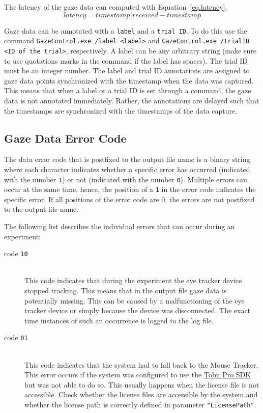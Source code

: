 \documentclass[a4paper,oneside]{book}
\begin{document}
The latency of the gaze data can computed with Equation~\ref{eq.latency}.
\begin{equation}
    \label{eq.latency}
    latency = timestamp\_received - timestamp
\end{equation}

Gaze data can be annotated with a \texttt{label} and a \texttt{trial ID}.
To do this use the command \texttt{GazeControl.exe /label <label>} and \texttt{GazeControl.exe /trialID <ID of the trial>}, respectively.
A label can be any arbitrary string (make sure to use quotations marks in the command if the label has spaces).
The trial ID must be an integer number.
The label and trial ID annotations are assigned to gaze data points synchronized with the timestamp when the data was captured.
This means that when a label or a trial ID is set through a command, the gaze data is not annotated immediately.
Rather, the annotations are delayed such that the timestamps are synchronized with the timestamps of the data capture.

\subsection{Gaze Data Error Code}
\label{sect.data.error}
The data error code that is postfixed to the output file name is a binary string where each character indicates whether a specific error has occurred (indicated with the number \texttt{1}) or not (indicated with the number \texttt{0}).
Multiple errors can occur at the same time, hence, the position of a \texttt{1} in the error code indicates the specific error.
If all positions of the error code are 0, the errors are not postfixed to the output file name.

The following list describes the individual errors that can occur during an experiment:
\begin{description}
    \item[code \texttt{10}] \hfill \\
        This code indicates that during the experiment the eye tracker device stopped tracking.
        This means that in the output file gaze data is potentially missing.
        This can be caused by a malfunctioning of the eye tracker device or simply because the device was disconnected.
        The exact time instances of such an occurrence is logged to the log file.
    \item[code \texttt{01}] \hfill \\
        This code indicates that the system had to fall back to the Mouse Tracker.
        This error occurs if the system was configured to use the \href{http://developer.tobii.com/tobii-pro-sdk/}{Tobii Pro SDK} but was not able to do so.
        This usually happens when the license file is not accessible.
        Check whether the license files are accessible by the system and whether the license path is correctly defined in parameter \texttt{"LicensePath"}.
\end{description}
\end{document}
